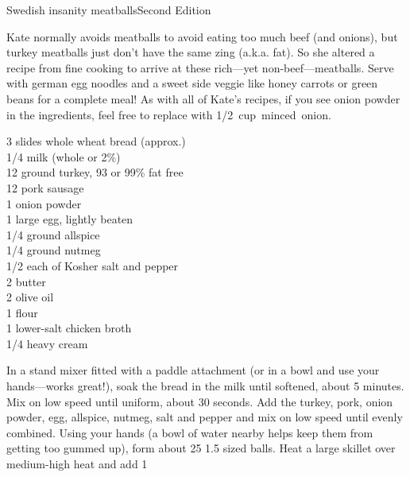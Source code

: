 \begin{entry}{Swedish insanity meatballs}{Second Edition}

\begin{open}
  Kate normally avoids meatballs to avoid eating too much beef (and onions),
  but turkey meatballs just don't have the same zing (a.k.a. fat). So she
  altered a recipe from fine cooking to arrive at these rich---yet
  non-beef---meatballs. Serve with german egg noodles and a sweet side veggie
  like honey carrots or green beans for a complete meal! As with all of Kate's
  recipes, if you see onion powder in the ingredients, feel free to replace
  with \SI{1/2}cup minced onion.
\end{open}
\begin{ingredients}
    3 slides whole wheat bread (approx.)\\
    \SI{1/4}{\cup} milk (whole or 2\%) \\
    \SI{12}{\ounce} ground turkey, 93 or 99\% fat free\\
    \SI{12}{\ounce} pork sausage\\
    \SI{1}{\teaspoon} onion powder\\
    1 large egg, lightly beaten\\
    \SI{1/4}{\teaspoon} ground allspice\\
    \SI{1/4}{\teaspoon} ground nutmeg\\
    \SI{1/2}{\teaspoon} each of Kosher salt and pepper\\
    \SI{2}{\tblspoon} butter\\
    \SI{2}{\tblspoon} olive oil\\
    \SI{1}{\tblspoon} flour\\
    \SI{1}{\cup} lower-salt chicken broth\\
    \SI{1/4}{\cup} heavy cream
\end{ingredients}
In a stand mixer fitted with a paddle attachment (or in a bowl and use your
hands---works great!), soak the bread in the milk until softened, about 5
minutes. Mix on low speed until uniform, about 30 seconds. Add the turkey,
pork, onion powder, egg, allspice, nutmeg, salt and pepper and mix on low
speed until evenly combined. Using your hands (a bowl of water nearby helps
keep them from getting too gummed up), form about 25 \SI{1.5}{\inch} sized
balls. Heat a large skillet over medium-high heat and add \SI{1}{\tblspoon}

\end{entry}
